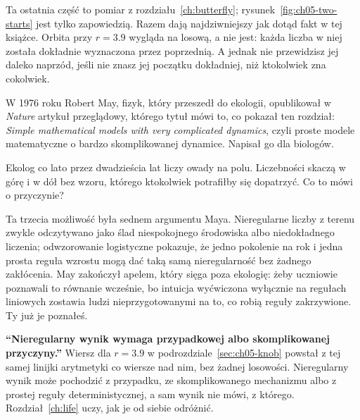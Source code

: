 
\noindent
Ta ostatnia część to pomiar z rozdziału~\ref{ch:butterfly};
rysunek~\ref{fig:ch05-two-starts} jest tylko zapowiedzią. Razem dają najdziwniejszy jak dotąd fakt w tej książce. Orbita
przy $r = \num{3.9}$ wygląda na losową, a nie jest: każda liczba w niej
została dokładnie wyznaczona przez poprzednią. A jednak nie przewidzisz jej
daleko naprzód, jeśli nie znasz jej początku dokładniej, niż ktokolwiek zna
cokolwiek.

W 1976 roku Robert May, fizyk, który przeszedł do ekologii, opublikował w
\emph{Nature} artykuł przeglądowy, którego tytuł mówi to, co pokazał ten
rozdział: \emph{Simple mathematical models with very complicated dynamics},
czyli proste modele matematyczne o bardzo skomplikowanej dynamice. Napisał
go dla biologów.

\begin{think}
Ekolog co lato przez dwadzieścia lat liczy owady na polu. Liczebności
skaczą w górę i w dół bez wzoru, którego ktokolwiek potrafiłby się
dopatrzyć. Co to mówi o przyczynie?
\end{think}

\noindent
Ta trzecia możliwość była sednem argumentu Maya. Nieregularne liczby z
terenu zwykle odczytywano jako ślad niespokojnego środowiska albo
niedokładnego liczenia; odwzorowanie logistyczne pokazuje, że jedno
pokolenie na rok i jedna prosta reguła wzrostu mogą dać taką samą
nieregularność bez żadnego zakłócenia. May zakończył apelem, który sięga
poza ekologię: żeby uczniowie poznawali to równanie wcześnie, bo intuicja
wyćwiczona wyłącznie na regułach liniowych zostawia ludzi
nieprzygotowanymi na to, co robią reguły zakrzywione. Ty już je poznałeś.

\begin{trapbox}
\textbf{\enquote{Nieregularny wynik wymaga przypadkowej albo skomplikowanej
przyczyny.}} Wiersz dla $r = \num{3.9}$ w podrozdziale~\ref{sec:ch05-knob}
powstał z tej samej linijki arytmetyki co wiersze nad nim, bez żadnej
losowości. Nieregularny wynik może pochodzić z przypadku, ze
skomplikowanego mechanizmu albo z prostej reguły deterministycznej, a sam
wynik nie mówi, z którego. Rozdział~\ref{ch:life} uczy, jak je od siebie
odróżnić.
\end{trapbox}

